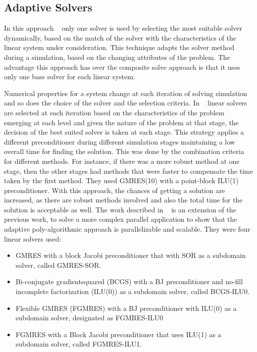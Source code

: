 \subsection{Adaptive Solvers}
In this approach ~\cite{adaptive1,adaptive2,adaptive3,adaptive4,adaptive5} only one solver is used by selecting the most suitable solver dynamically, based on the match of the solver with the characteristics of the linear system under consideration. This technique adapts the solver method during a simulation, based on the changing attributes of the problem. The advantage this approach has over the composite solve approach is that it uses only one base solver for each linear system. 

Numerical properties for a system change at each iteration of solving simulation and so does the choice of the solver and the selection criteria. In ~\cite{adaptive1} linear solvers are selected at each iteration based on the characteristics of the problem emerging at each level and given the nature of the problem at that stage, the decision of the best suited solver is taken at each stage. This strategy applies a different preconditioner during different simulation stages maintaining a low overall time for finding the solution. This was done by the combination criteria for different methods. For instance, if there was a more robust method at one stage, then the other stages had methods that were faster to compensate the time taken by the first method. They used GMRES(10) with a point-block ILU(1) preconditioner. With this approach, the chances of getting a solution are increased, as there are robust methods involved and also the total time for the solution is acceptable as well. The work described in ~\cite{adaptive4} is an extension of the previous work, to solve a more complex parallel application to show that the adaptive poly-algorithmic approach is parallelizable and scalable. They were four linear solvers used: 
\begin{itemize}
    \item GMRES with a block Jacobi preconditioner that with SOR as a subdomain solver, called GMRES-SOR.
    \item Bi-conjugate gradientsquared (BCGS) with a BJ preconditioner and no-fill incomplete factorization (ILU(0)) as a subdomain solver, called BCGS-ILU0.
    \item Flexible GMRES (FGMRES) with a BJ preconditioner with ILU(0) as a subdomain solver, designated as FGMRES-ILU0
    \item FGMRES with a Block Jacobi preconditioner that uses ILU(1) as a subdomain solver, called FGMRES-ILU1.
\end{itemize}

